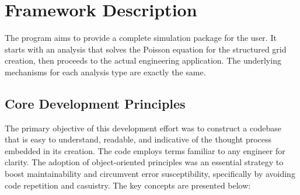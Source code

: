 \documentclass{article}
\begin{document}
	\section{Framework Description}
	The program aims to provide a complete simulation package for the user. It starts with an analysis that solves the Poisson equation for the structured grid creation, then proceeds to the actual engineering application. The underlying mechanisms for each analysis type are exactly the same.
	
		\subsection{Core Development Principles}
	The primary objective of this development effort was to construct a codebase that is easy to understand, readable, and indicative of the thought process embedded in its creation. The code employs terms familiar to any engineer for clarity. The adoption of object-oriented principles was an essential strategy to boost maintainability and circumvent error susceptibility, specifically by avoiding code repetition and casuistry. The key concepts are presented below:
	
\end{document}
